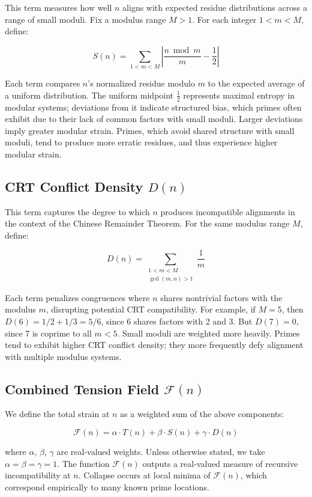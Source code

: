\documentclass[11pt]{article}
\begin{document}
This term measures how well $n$ aligns with expected residue distributions across a range of small moduli. Fix a modulus range $M > 1$. For each integer $1 < m < M$, define:

\[
S(n) = \sum_{1 < m < M} \left| \frac{n \bmod m}{m} - \frac{1}{2} \right|
\]

Each term compares $n$'s normalized residue modulo $m$ to the expected average of a uniform distribution. The uniform midpoint \( \frac{1}{2} \) represents maximal entropy in modular systems; deviations from it indicate structured bias, which primes often exhibit due to their lack of common factors with small moduli. Larger deviations imply greater modular strain. Primes, which avoid shared structure with small moduli, tend to produce more erratic residues, and thus experience higher modular strain.

\subsection{CRT Conflict Density $D(n)$}

This term captures the degree to which $n$ produces incompatible alignments in the context of the Chinese Remainder Theorem. For the same modulus range $M$, define:

\[
D(n) = \sum_{\substack{1 < m < M \\ \gcd(m, n) > 1}} \frac{1}{m}
\]

Each term penalizes congruences where $n$ shares nontrivial factors with the modulus $m$, disrupting potential CRT compatibility. For example, if \(M = 5\), then \(D(6) = 1/2 + 1/3 = 5/6\), since 6 shares factors with 2 and 3. But \(D(7) = 0\), since 7 is coprime to all \(m < 5\). Small moduli are weighted more heavily. Primes tend to exhibit higher CRT conflict density; they more frequently defy alignment with multiple modulus systems.

\subsection{Combined Tension Field $\mathcal{F}(n)$}

We define the total strain at $n$ as a weighted sum of the above components:

\[
\mathcal{F}(n) = \alpha \cdot T(n) + \beta \cdot S(n) + \gamma \cdot D(n)
\]

where $\alpha$, $\beta$, $\gamma$ are real-valued weights. Unless otherwise stated, we take $\alpha = \beta = \gamma = 1$. The function $\mathcal{F}(n)$ outputs a real-valued measure of recursive incompatibility at $n$. Collapse occurs at local minima of $\mathcal{F}(n)$, which correspond empirically to many known prime locations.
\end{document}
